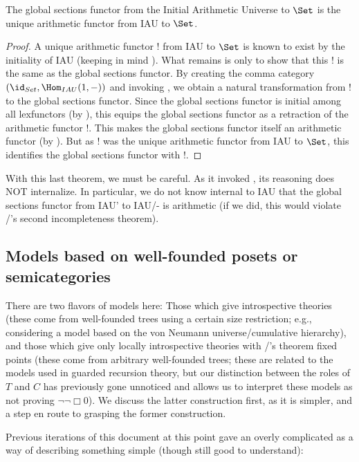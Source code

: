 \begin{theorem}
The global sections functor from the Initial Arithmetic Universe to $\Set$ is the unique arithmetic functor from IAU to $\Set$.
\end{theorem}
\begin{proof}
A unique arithmetic functor $!$ from IAU to $\Set$ is known to exist by the initiality of IAU (keeping in mind ). What remains is only to show that this $!$ is the same as the global sections functor. By creating the comma category $(\id_{Set}, \Hom_{IAU}(1, -))$ and invoking , we obtain a natural transformation from $!$ to the global sections functor. Since the global sections functor is initial among all lexfunctors (by ), this equips the global sections functor as a retraction of the arithmetic functor $!$. This makes the global sections functor itself an arithmetic functor (by ). But as $!$ was the unique arithmetic functor from IAU to $\Set$, this identifies the global sections functor with $!$.
\end{proof}

With this last theorem, we must be careful. As it invoked , its reasoning does NOT internalize. In particular, we do not know internal to IAU that the global sections functor from IAU' to IAU/- is arithmetic (if we did, this would violate \Goedel/'s second incompleteness theorem).

\subsection{Models based on well-founded posets or semicategories}
There are two flavors of models here: Those which give introspective theories (these come from well-founded trees using a certain size restriction; e.g., considering a model based on the von Neumann universe/cumulative hierarchy), and those which give only locally introspective theories with \Loeb/'s theorem fixed points (these come from arbitrary well-founded trees; these are related to the models used in guarded recursion theory, but our distinction between the roles of $T$ and $C$ has previously gone unnoticed and allows us to interpret these models as not proving $\lnot \lnot \Box 0$). We discuss the latter construction first, as it is simpler, and a step en route to grasping the former construction.

Previous iterations of this document at this point gave an overly complicated as a way of describing something simple (though still good to understand):

